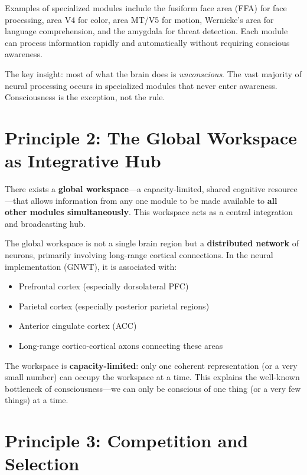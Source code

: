 \documentclass[11pt,a4paper]{report}
\begin{document}
Examples of specialized modules include the fusiform face area (FFA) for face processing, area V4 for color, area MT/V5 for motion, Wernicke's area for language comprehension, and the amygdala for threat detection. Each module can process information rapidly and automatically without requiring conscious awareness.

The key insight: most of what the brain does is \emph{unconscious}. The vast majority of neural processing occurs in specialized modules that never enter awareness. Consciousness is the exception, not the rule.

\section{Principle 2: The Global Workspace as Integrative Hub}

\begin{principlebox}
There exists a \textbf{global workspace}---a capacity-limited, shared cognitive resource---that allows information from any one module to be made available to \textbf{all other modules simultaneously}. This workspace acts as a central integration and broadcasting hub.
\end{principlebox}

The global workspace is not a single brain region but a \textbf{distributed network} of neurons, primarily involving long-range cortical connections. In the neural implementation (GNWT), it is associated with:
\begin{itemize}[leftmargin=1.5em]
  \item Prefrontal cortex (especially dorsolateral PFC)
  \item Parietal cortex (especially posterior parietal regions)
  \item Anterior cingulate cortex (ACC)
  \item Long-range cortico-cortical axons connecting these areas
\end{itemize}

The workspace is \textbf{capacity-limited}: only one coherent representation (or a very small number) can occupy the workspace at a time. This explains the well-known bottleneck of consciousness---we can only be conscious of one thing (or a very few things) at a time.

\section{Principle 3: Competition and Selection}
\end{document}
